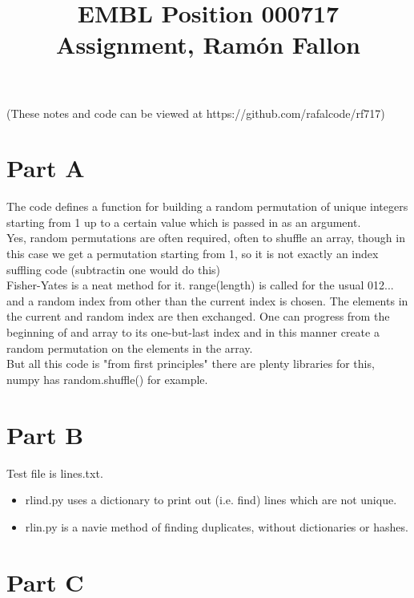 \documentclass[14pt]{article}
\begin{document}
\title{EMBL Position 000717 Assignment, Ram\'on Fallon}
\maketitle

(These notes and code can be viewed at https://github.com/rafalcode/rf717)

\section*{Part A}

The code defines a function for building a random permutation of unique integers starting from 1 up to a certain value which is passed in as an argument. \\

Yes, random permutations are often required, often to shuffle an array, though in this case we get a permutation starting from 1, so it is not exactly an index suffling code (subtractin one would do this) \\

Fisher-Yates is a neat method for it. range(length) is called for the usual 012... and a random index from other than the current index is chosen. The elements in the current and random index are then exchanged. One can progress from the beginning of and array to its one-but-last index and in this manner create a random permutation on the elements in the array. \\

But all this code is "from first principles" there are plenty libraries for this, numpy has random.shuffle() for example.

\section*{Part B}

Test file is lines.txt.

\begin{itemize}
    \item rlind.py uses a dictionary to print out (i.e. find) lines which are not unique.
    \item rlin.py is a navie method of finding duplicates, without dictionaries or hashes.
\end{itemize}

\section*{Part C}
\end{document}
